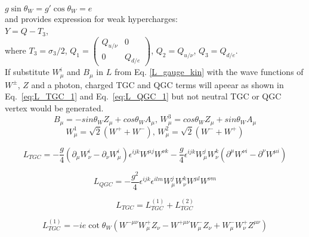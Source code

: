 $g \sin \theta_W = g' \cos \theta_W = e$\\

and provides expression for weak hypercharges:\\

$Y = Q - T_3$,\\

where $T_3 = \sigma_3 / 2$, $Q_1 = \begin{pmatrix} Q_{u/\nu} & 0 \\ 0 & Q_{d/e} \end{pmatrix}$, $Q_2 = Q_{u/\nu}$, $Q_3=Q_{d/e}$.\\

If substitute $W_\mu^i$ and $B_\mu$ in $L$ from Eq. \ref{L_gauge_kin} with the wave functions of $W^\pm$, $Z$ and a photon, charged TGC and QGC terms will apeear as shown in Eq.~\ref{eq:L_TGC_1} and Eq.~\ref{eq:L_QGC_1} but not neutral TGC or QGC vertex would be generated.\\

\begin{equation} \label{eq:EWK_Zg_bosons_mixing}
B_\mu = -sin \theta_W Z_\mu + cos \theta_W A_\mu \text{, } W_\mu^3 = cos \theta_W Z_\mu + sin \theta_W A_\mu
\end{equation}
\begin{equation} \label{eq:EWK_Zg_bosons_mixing}
W_\mu^1 = \sqrt{2}(W^+ + W^-) \text{, }W_\mu^2 = \sqrt{2}(W^- + W^+)
\end{equation}

\begin{equation} \label{eq:L_TGC_1}
L_{TGC} = -\frac{g}{4}(\partial_\mu W_\nu^i - \partial_\nu W_\mu^i)\epsilon^{ijk}W^{\mu j}W^{\nu k} - \frac{g}{4}\epsilon^{ijk}W_\mu^j W_\nu^k (\partial^\mu W^{\nu i} - \partial^\nu W^{\mu i})
\end{equation}

\begin{equation} \label{eq:L_QGC_1}
L_{QGC} = -\frac{g^2}{4} \epsilon^{ijk} \epsilon^{ilm} W_\mu^j W_\nu^k W^{\mu l} W^{\nu m}
\end{equation}

\begin{equation} \label{eq:L_TGC_2}
L_{TGC} = L_{TGC}^{(1)} + L_{TGC}^{(2)}
\end{equation}

\begin{equation} \label{eq:L_TGC_2_1}
L_{TGC}^{(1)} = -ie \cot \theta_W (W^{-\mu\nu} W^{+}_\mu Z_\nu - W^{+\mu\nu} W^-_\mu Z_\nu +W^-_\mu W^+_\nu Z^{\mu\nu}) 
\end{equation}

